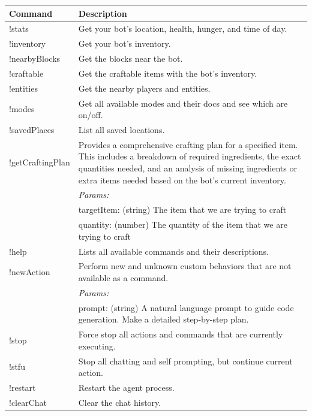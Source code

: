 \documentclass{article}
\begin{document}
\begin{table}[htbp]
  \centering
  \begin{tabular}{|p{}|p{}|}
    \hline
    \textbf{Command} & \textbf{Description} \\
    \hline
    !stats & Get your bot's location, health, hunger, and time of day. \\
    \hline
    !inventory & Get your bot's inventory. \\
    \hline
    !nearbyBlocks & Get the blocks near the bot. \\
    \hline
    !craftable & Get the craftable items with the bot's inventory. \\
    \hline
    !entities & Get the nearby players and entities. \\
    \hline
    !modes & Get all available modes and their docs and see which are on/off. \\
    \hline
    !savedPlaces & List all saved locations. \\
    \hline
    !getCraftingPlan & Provides a comprehensive crafting plan for a specified item. This includes a breakdown of required ingredients, the exact quantities needed, and an analysis of missing ingredients or extra items needed based on the bot's current inventory. \\
    & \textit{Params:} \\
    & targetItem: (string) The item that we are trying to craft \\
    & quantity: (number) The quantity of the item that we are trying to craft \\
    \hline
    !help & Lists all available commands and their descriptions. \\
    \hline
    !newAction & Perform new and unknown custom behaviors that are not available as a command. \\
    & \textit{Params:} \\
    & prompt: (string) A natural language prompt to guide code generation. Make a detailed step-by-step plan. \\
    \hline
    !stop & Force stop all actions and commands that are currently executing. \\
    \hline
    !stfu & Stop all chatting and self prompting, but continue current action. \\
    \hline
    !restart & Restart the agent process. \\
    \hline
    !clearChat & Clear the chat history. \\

\end{tabular}
\end{table}
\end{document}
